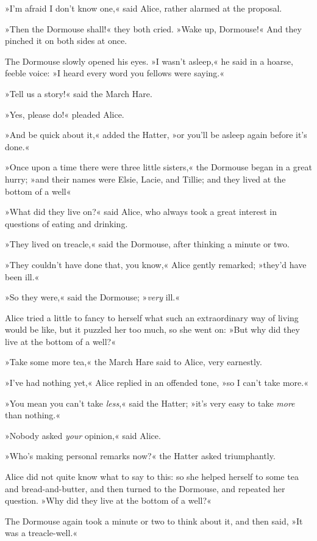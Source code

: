 »I'm afraid I don't know one,« said Alice, rather alarmed at the proposal.

»Then the Dormouse shall!« they both cried. »Wake up, Dormouse!« And they pinched it on both sides at once.

The Dormouse slowly opened his eyes. »I wasn't asleep,« he said in a hoarse, feeble voice: »I heard every word you fellows were saying.«

»Tell us a story!« said the March Hare.

»Yes, please do!« pleaded Alice.

»And be quick about it,« added the Hatter, »or you'll be asleep again before it's done.«

»Once upon a time there were three little sisters,« the Dormouse began in a great hurry; »and their names were Elsie, Lacie, and Tillie; and they lived at the bottom of a well\longdash«

»What did they live on?« said Alice, who always took a great interest in questions of eating and drinking.

»They lived on treacle,« said the Dormouse, after thinking a minute or two.

»They couldn't have done that, you know,« Alice gently remarked; »they'd have been ill.«

»So they were,« said the Dormouse; »\textit{very} ill.«

Alice tried a little to fancy to herself what such an extraordinary way of living would be like, but it puzzled her too much, so she went on: »But why did they live at the bottom of a well?«

»Take some more tea,« the March Hare said to Alice, very earnestly.

»I've had nothing yet,« Alice replied in an offended tone, »so I can't take more.«

»You mean you can't take \textit{less},« said the Hatter; »it's very easy to take \textit{more} than nothing.«

»Nobody asked \textit{your} opinion,« said Alice.

»Who's making personal remarks now?« the Hatter asked triumphantly.

Alice did not quite know what to say to this: so she helped herself to some tea and bread-and-butter, and then turned to the Dormouse, and repeated her question. »Why did they live at the bottom of a well?«

The Dormouse again took a minute or two to think about it, and then said, »It was a treacle-well.«

